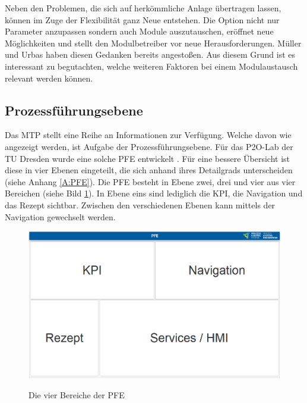 Neben den Problemen, die sich auf herkömmliche Anlage übertragen lassen, können im Zuge der Flexibilität ganz Neue entstehen. Die Option nicht nur Parameter anzupassen sondern auch Module auszutauschen, eröffnet neue Möglichkeiten und stellt den Modulbetreiber vor neue Herausforderungen. Müller und Urbas \cite{Muller2017} haben diesen Gedanken bereits angestoßen. Aus diesem Grund ist es interessant zu begutachten, welche weiteren Faktoren bei einem Modulaustausch relevant werden können.

\subsection{Prozessführungsebene}
\label{3:PFE}
Das MTP stellt eine Reihe an Informationen zur Verfügung. Welche davon wie angezeigt werden, ist Aufgabe der Prozessführungsebene. Für das P2O-Lab der TU Dresden wurde eine solche PFE entwickelt . Für eine bessere Übersicht ist diese in vier Ebenen eingeteilt, die sich anhand ihres Detailgrads unterscheiden (siehe Anhang \ref{A:PFE}). Die PFE besteht in Ebene zwei, drei und vier aus vier Bereichen (siehe Bild \ref{pic:Bereiche-PFE}). In Ebene eins sind lediglich die KPI, die Navigation und das Rezept sichtbar. Zwischen den verschiedenen Ebenen kann mittels der Navigation gewechselt werden.
\begin{figure}[htbp]
\centering
\includegraphics[scale=0.25]{DA_files/Bilder/Analyse/PFE-Bereiche.png}
\label{pic:Bereiche-PFE}
\caption{Die vier Bereiche der PFE}
\end{figure}


